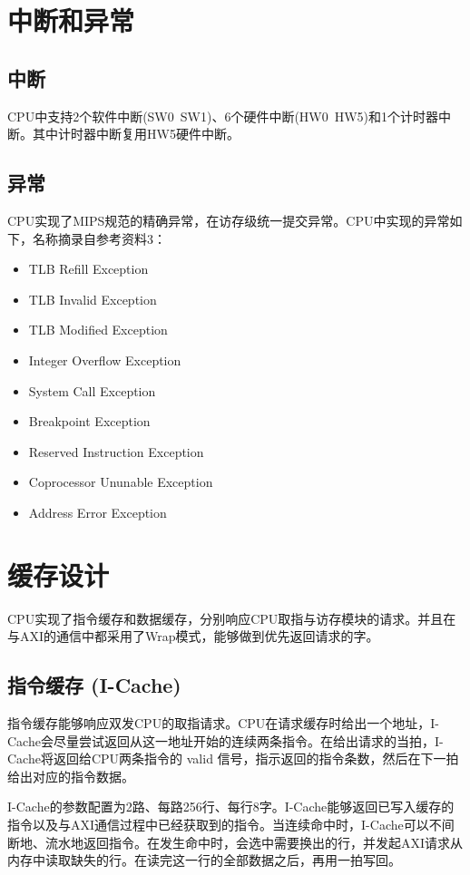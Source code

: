 \section{中断和异常}
\subsection{中断}
CPU中支持2个软件中断(SW0~SW1)、6个硬件中断(HW0~HW5)和1个计时器中断。其中计时器中断复用HW5硬件中断。

\subsection{异常}
CPU实现了MIPS规范的精确异常，在访存级统一提交异常。CPU中实现的异常如下，名称摘录自参考资料3：
\begin{itemize}
    \item TLB Refill Exception 
    \item TLB Invalid Exception
    \item TLB Modified Exception
    \item Integer Overflow Exception
    \item System Call Exception
    \item Breakpoint Exception
    \item Reserved Instruction Exception
    \item Coprocessor Ununable Exception
    \item Address Error Exception
\end{itemize}

\section{缓存设计}

CPU实现了指令缓存和数据缓存，分别响应CPU取指与访存模块的请求。并且在与AXI的通信中都采用了Wrap模式，能够做到优先返回请求的字。

\subsection{指令缓存 (I-Cache)}

指令缓存能够响应双发CPU的取指请求。CPU在请求缓存时给出一个地址，I-Cache会尽量尝试返回从这一地址开始的连续两条指令。在给出请求的当拍，I-Cache将返回给CPU两条指令的 valid 信号，指示返回的指令条数，然后在下一拍给出对应的指令数据。

I-Cache的参数配置为2路、每路256行、每行8字。I-Cache能够返回已写入缓存的指令以及与AXI通信过程中已经获取到的指令。当连续命中时，I-Cache可以不间断地、流水地返回指令。在发生命中时，会选中需要换出的行，并发起AXI请求从内存中读取缺失的行。在读完这一行的全部数据之后，再用一拍写回。

